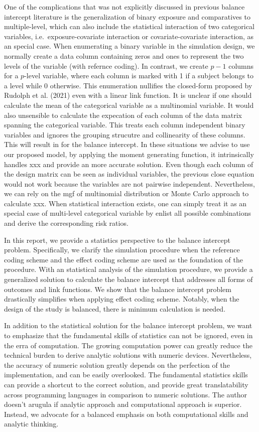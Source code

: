 \documentclass[
]{article}
\begin{document}
One of the complications that was not explicitly discussed in previous
balance intercept literature is the generalization of binary exposure
and comparatives to multiple-level, which can also include the
statistical interaction of two categorical variables,
i.e.~exposure-covariate interaction or covariate-covariate interaction,
as an special case. When enumerating a binary variable in the simulation
design, we normally create a data column containing zeros and ones to
represent the two levels of the variable (with refernce coding). In
contrast, we create \(p-1\) columns for a \(p\)-level variable, where
each column is marked with 1 if a subject belongs to a level while 0
otherwise. This enumeration nullifies the closed-form proposed by
Rudolph et al. (2021) even with a linear link function. It is unclear if
one should calculate the mean of the categorical variable as a
multinomial variable. It would also unsensible to calculate the
expecation of each column of the data matrix spanning the categorical
variable. This treats each column independent binary variables and
ignores the grouping strucutre and collinearity of these columns. This
will result in for the balance intercept. In these situations we advise
to use our proposed model, by applying the moment generating function,
it intrinsically handles xxx and provide an more accurate solution. Even
though each column of the design matrix can be seen as individual
variables, the previous close equation would not work because the
variables are not pairwise independent. Nevertheless, we can rely on the
mgf of multinomial distribution or Monte Carlo approach to calculate
xxx. When statistical interaction exists, one can simply treat it as an
special case of multi-level categorical variable by enlist all possible
combinations and derive the corresponding risk ratios.

In this report, we provide a statistics perspective to the balance
intercept problem. Specifically, we clarify the simulation procedure
when the reference coding scheme and the effect coding scheme are used
as the foundation of the procedure. With an statistical analysis of the
simulation procedure, we provide a generalized solution to calculate the
balance intercept that addresses all forms of outcomes and link
functions. We show that the balance intercept problem drastically
simplifies when applying effect coding scheme. Notably, when the design
of the study is balanced, there is minimum calculation is needed.

In addition to the statistical solution for the balance intercept
problem, we want to emphasize that the fundamental skills of statistics
can not be ignored, even in the erra of computation. The growing
computation power can greatly reduce the technical burden to derive
analytic solutions with numeric devices. Nevertheless, the accuracy of
numeric solution greatly depends on the perfection of the
implementation, and can be easily overlooked. The fundamental statistics
skills can provide a shortcut to the correct solution, and provide great
translatability across programming languages in comparison to numeric
solutions. The author doesn't arugula if analytic approach and
computational approach is superior. Instead, we advocate for a balanced
emphasis on both computational skills and analytic thinking.
\end{document}
